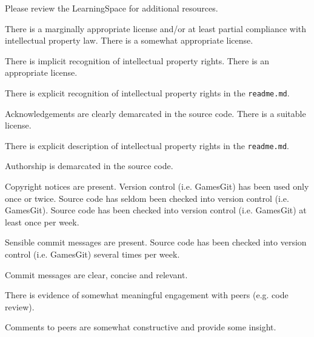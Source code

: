 \documentclass{../../fal_assignment}
\begin{document}
Please review the LearningSpace for additional resources.

\rubricmasters

\begin{markingrubric}
        \grade\fail There is a marginally appropriate license and/or at least partial compliance with intellectual property law.
        \grade There is a somewhat appropriate license.
            \par There is implicit recognition of intellectual property rights.
        \grade There is an appropriate license. 
            \par There is explicit recognition of intellectual property rights in the \texttt{readme.md}.
            \par Acknowledgements are clearly demarcated in the source code.
        \grade There is a suitable license.
            \par There is explicit description of intellectual property rights in the \texttt{readme.md}.
            \par Authorship is demarcated in the source code.
            \par Copyright notices are present.
%
        \grade\fail Version control (i.e. GamesGit) has been used only once or twice.
        \grade Source code has seldom been checked into version control (i.e. GamesGit).
        \grade Source code has been checked into version control (i.e. GamesGit) at least once per week.
            \par Sensible commit messages are present.
        \grade Source code  has been checked into version control (i.e. GamesGit) several times per week.
            \par Commit messages are clear, concise and relevant.
            \par There is evidence of somewhat meaningful engagement with peers (e.g. code review).
            \par Comments to peers are somewhat constructive and provide some insight.
%
\end{markingrubric}
\end{document}
